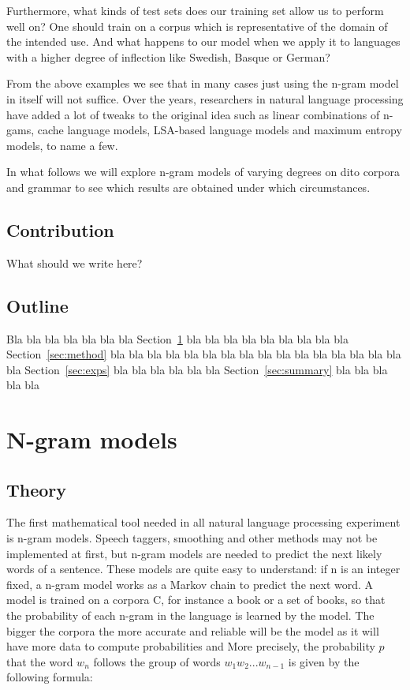 \documentclass[a4paper,12pt]{article}
\begin{document}
Furthermore, what kinds of test sets does our training set allow us to perform well on? One should train on a  corpus which is representative of the domain of the intended use. And what happens to our model when we apply it to languages with a higher degree of inflection like Swedish, Basque or German?

From the above examples we see that in many cases just using the n-gram model in itself will not suffice. Over the years, researchers in natural language processing have added a lot of tweaks to the original idea such as linear combinations of n-gams, cache language models, LSA-based language models and maximum entropy models, to name a few.

In what follows we will explore n-gram models of varying degrees on dito corpora and grammar to see which results are obtained under which circumstances.

\subsection{Contribution}
What should we write here?

\subsection{Outline}
Bla bla bla bla bla bla bla Section~\ref{sec:ngram} bla bla bla bla 
bla bla bla bla bla Section~\ref{sec:method} bla bla bla bla bla bla 
bla bla bla bla bla bla bla bla bla bla bla Section~\ref{sec:exps}
bla bla bla bla bla bla Section~\ref{sec:summary} bla bla bla bla bla

\section{N-gram models}
\label{sec:ngram}

\subsection{Theory}
The first mathematical tool needed in all natural language processing experiment is n-gram models. Speech taggers, smoothing and other methods may not be implemented at first, but n-gram models are needed to predict the next likely words of a sentence. 
These models are quite easy to understand: if n is an integer fixed, a n-gram model works as a Markov chain to predict the next word. A model is trained on a corpora C, for instance a book or a set of books, so that the probability of each n-gram in the language is learned by the model. The bigger the corpora the more accurate and reliable will be the model as it will have more data to compute probabilities and  More precisely, the probability $p$ that the word $w_n$ follows the group of words $w_1 w_2 ... w_{n-1}$ is given by the following formula:
\end{document}
